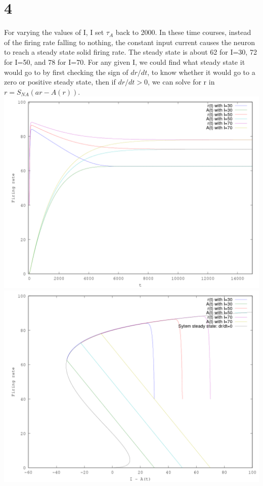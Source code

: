 \documentclass[11pt]{article}
\begin{document}
\section*{4}
For varying the values of I, I set $\tau_A$ back to 2000.
In these time courses, instead of the firing rate falling
to nothing, the constant input current causes the neuron
to reach a steady state solid firing rate.
The steady state is about 62 for I=30, 72 for I=50,
and 78 for I=70.
For any given I, we could find what steady state it would 
go to by first checking the sign of $dr/dt$,
to know whether it would go to a zero or positive steady state,
then if $dr/dt>0$, we can solve for r in $r=S_{NA}(ar-A(r))$.\\
\includegraphics[width=6in]{4t.png}\\
\includegraphics[width=6in]{4p.png}\\
\end{document}
